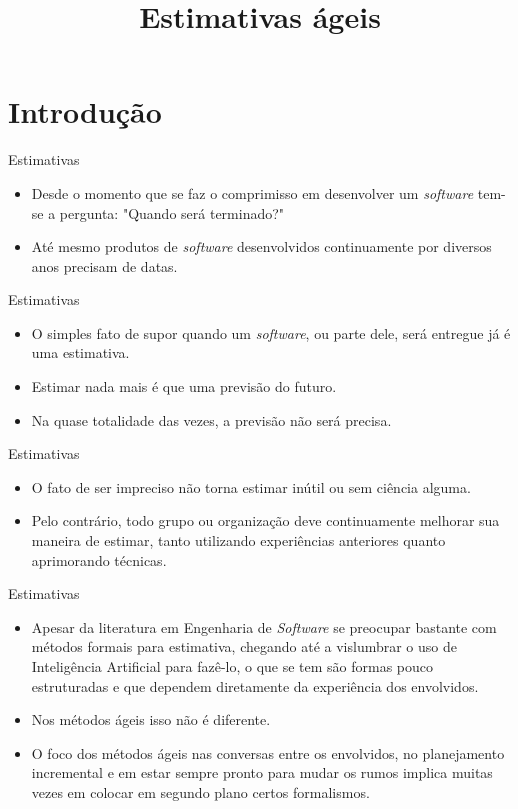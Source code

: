 \documentclass[11pt]{beamer}
\title{Estimativas ágeis}
\author{}
\date{}
\begin{document}
    \begin{frame}[plain]
        \titlepage
    \end{frame}

   \section{Introdução}

    \begin{frame}{Estimativas}
        \begin{itemize}
            \item Desde o momento que se faz o comprimisso em desenvolver um \textit{software} tem-se a pergunta: "Quando será terminado?"
            \item Até mesmo produtos de \textit{software} desenvolvidos continuamente por diversos anos precisam de datas.
        \end{itemize}
    \end{frame}

    \begin{frame}{Estimativas}
        \begin{itemize}
            \item O simples fato de supor quando um \textit{software}, ou parte dele, será entregue já é uma estimativa.
            \item Estimar nada mais é que uma previsão do futuro.
            \item Na quase totalidade das vezes, a previsão não será precisa.
        \end{itemize}
    \end{frame}

    \begin{frame}{Estimativas}
        \begin{itemize}
            \item O fato de ser impreciso não torna estimar inútil ou sem ciência alguma.
            \item Pelo contrário, todo grupo ou organização deve continuamente melhorar sua maneira de estimar, tanto utilizando experiências anteriores quanto aprimorando técnicas.
        \end{itemize}
    \end{frame}

    \begin{frame}{Estimativas}
        \begin{itemize}
            \item Apesar da literatura em Engenharia de \textit{Software} se preocupar bastante com métodos formais para estimativa, chegando até a vislumbrar o uso de Inteligência Artificial para fazê-lo, o que se tem são formas pouco estruturadas e que dependem diretamente da experiência dos envolvidos.
            \item Nos métodos ágeis isso não é diferente.
            \item O foco dos métodos ágeis nas conversas entre os envolvidos, no planejamento incremental e em estar sempre pronto para mudar os rumos implica muitas vezes em colocar em segundo plano certos formalismos. 
        \end{itemize}
    \end{frame}
\end{document}
